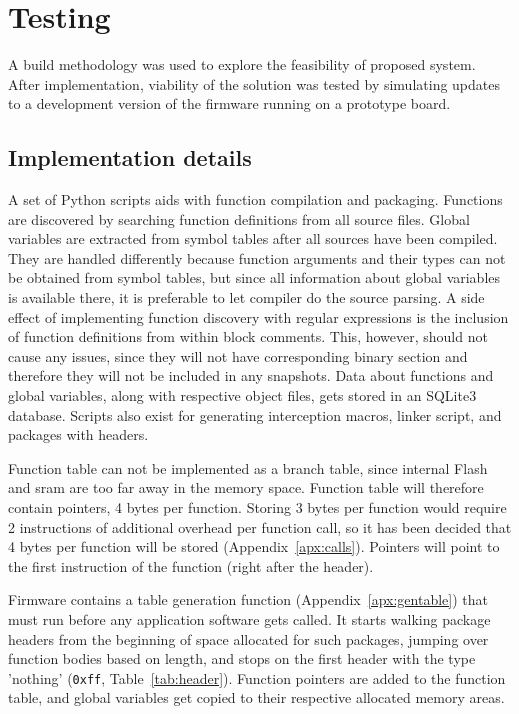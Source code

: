 \newpage
\section{Testing}
\label{s:testing}

A build methodology was used to explore the feasibility of proposed system. After implementation, viability of the solution was tested by simulating updates to a development version of the firmware running on a prototype board.

\subsection{Implementation details}

A set of Python scripts aids with function compilation and packaging. Functions are discovered by searching function definitions from all source files. Global variables are extracted from symbol tables after all sources have been compiled. They are handled differently because function arguments and their types can not be obtained from symbol tables, but since all information about global variables is available there, it is preferable to let compiler do the source parsing. A side effect of implementing function discovery with regular expressions is the inclusion of function definitions from within block comments. This, however, should not cause any issues, since they will not have corresponding binary section and therefore they will not be included in any snapshots. Data about functions and global variables, along with respective object files, gets stored in an SQLite3 database. Scripts also exist for generating interception macros, linker script, and packages with headers.

Function table can not be implemented as a branch table, since internal Flash and \gls{sram} are too far away in the memory space. Function table will therefore contain pointers, 4 bytes per function. Storing 3 bytes per function would require 2 instructions of additional overhead per function call, so it has been decided that 4 bytes per function will be stored (Appendix~\ref{apx:calls}). Pointers will point to the first instruction of the function (right after the header).

Firmware contains a table generation function (Appendix~\ref{apx:gentable}) that must run before any application software gets called. It starts walking package headers from the beginning of space allocated for such packages, jumping over function bodies based on length, and stops on the first header with the type 'nothing' (\texttt{0xff}, Table~\ref{tab:header}). Function pointers are added to the function table, and global variables get copied to their respective allocated memory areas.

